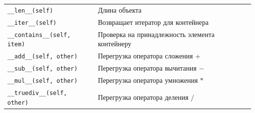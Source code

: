 \begin{table}[h!]
\begin{longtable}{|p{7cm}|p{8cm}|}




\texttt{\_\_len\_\_(self)} & Длина объекта \\




\texttt{\_\_iter\_\_(self)} & Возвращает итератор для контейнера \\


\texttt{\_\_contains\_\_(self, item)} & Проверка на принадлежность элемента контейнеру \\\hline

\texttt{\_\_add\_\_(self, other)} & Перегрузка оператора сложения $+$ \\

\texttt{\_\_sub\_\_(self, other)} & Перегрузка оператора вычитания $-$ \\

\texttt{\_\_mul\_\_(self, other)} & Перегрузка оператора умножения $*$ \\

\texttt{\_\_truediv\_\_(self, other)} & Перегрузка оператора деления $/$ \\



\end{longtable}
\end{table}
